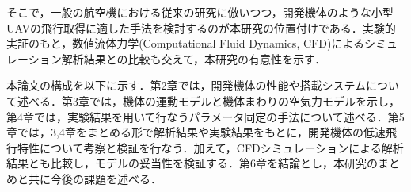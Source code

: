 そこで，一般の航空機における従来の研究に倣いつつ，開発機体のような小型UAVの飛行取得に適した手法を検討するのが本研究の位置付けである．実験的実証のもと，数値流体力学(Computational Fluid Dynamics, CFD)によるシミュレーション解析結果との比較も交えて，本研究の有意性を示す．

本論文の構成を以下に示す．第2章では，開発機体の性能や搭載システムについて述べる．第3章では，機体の運動モデルと機体まわりの空気力モデルを示し，第4章では，実験結果を用いて行なうパラメータ同定の手法について述べる．第5章では，3,4章をまとめる形で解析結果や実験結果をもとに，開発機体の低速飛行特性について考察と検証を行なう．加えて，CFDシミュレーションによる解析結果とも比較し，モデルの妥当性を検証する．第6章を結論とし，本研究のまとめと共に今後の課題を述べる．
